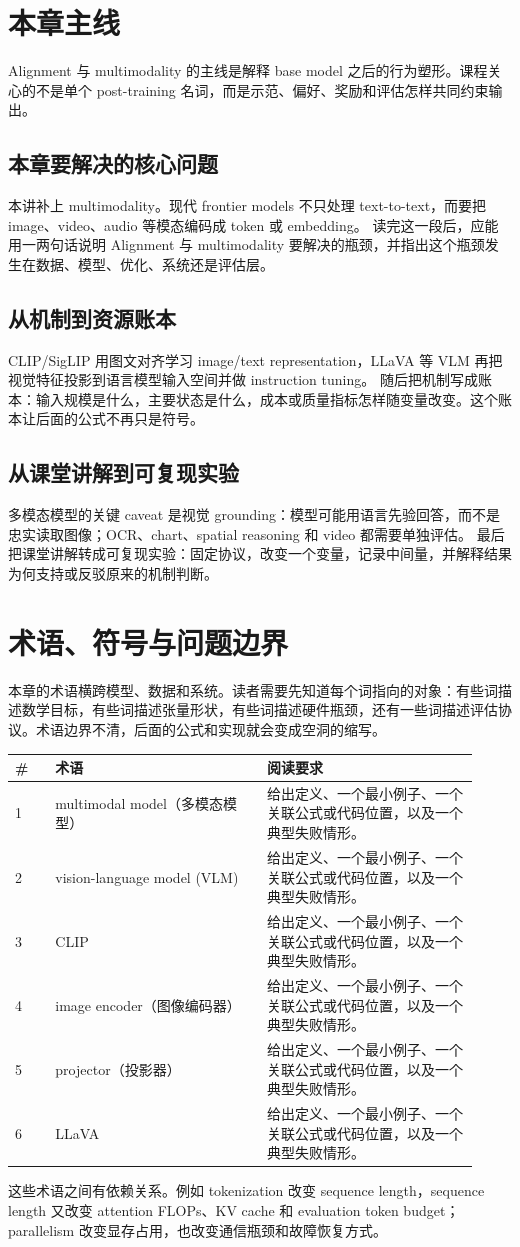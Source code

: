 \documentclass[a4paper]{article}
\begin{document}
\section{本章主线}
Alignment 与 multimodality 的主线是解释 base model 之后的行为塑形。课程关心的不是单个 post-training 名词，而是示范、偏好、奖励和评估怎样共同约束输出。
\subsection{本章要解决的核心问题}
本讲补上 multimodality。现代 frontier models 不只处理 text-to-text，而要把 image、video、audio 等模态编码成 token 或 embedding。
读完这一段后，应能用一两句话说明 Alignment 与 multimodality 要解决的瓶颈，并指出这个瓶颈发生在数据、模型、优化、系统还是评估层。
\subsection{从机制到资源账本}
CLIP/SigLIP 用图文对齐学习 image/text representation，LLaVA 等 VLM 再把视觉特征投影到语言模型输入空间并做 instruction tuning。
随后把机制写成账本：输入规模是什么，主要状态是什么，成本或质量指标怎样随变量改变。这个账本让后面的公式不再只是符号。
\subsection{从课堂讲解到可复现实验}
多模态模型的关键 caveat 是视觉 grounding：模型可能用语言先验回答，而不是忠实读取图像；OCR、chart、spatial reasoning 和 video 都需要单独评估。
最后把课堂讲解转成可复现实验：固定协议，改变一个变量，记录中间量，并解释结果为何支持或反驳原来的机制判断。
\section{术语、符号与问题边界}
本章的术语横跨模型、数据和系统。读者需要先知道每个词指向的对象：有些词描述数学目标，有些词描述张量形状，有些词描述硬件瓶颈，还有一些词描述评估协议。术语边界不清，后面的公式和实现就会变成空洞的缩写。
\begin{longtable}{p{0.08\linewidth}p{0.42\linewidth}p{0.42\linewidth}}
\toprule
\textbf{\#} & \textbf{术语} & \textbf{阅读要求}\\
\midrule
1 & multimodal model（多模态模型） & 给出定义、一个最小例子、一个关联公式或代码位置，以及一个典型失败情形。\\
2 & vision-language model (VLM) & 给出定义、一个最小例子、一个关联公式或代码位置，以及一个典型失败情形。\\
3 & CLIP & 给出定义、一个最小例子、一个关联公式或代码位置，以及一个典型失败情形。\\
4 & image encoder（图像编码器） & 给出定义、一个最小例子、一个关联公式或代码位置，以及一个典型失败情形。\\
5 & projector（投影器） & 给出定义、一个最小例子、一个关联公式或代码位置，以及一个典型失败情形。\\
6 & LLaVA & 给出定义、一个最小例子、一个关联公式或代码位置，以及一个典型失败情形。\\
\bottomrule
\end{longtable}
这些术语之间有依赖关系。例如 tokenization 改变 sequence length，sequence length 又改变 attention FLOPs、KV cache 和 evaluation token budget；parallelism 改变显存占用，也改变通信瓶颈和故障恢复方式。
\end{document}

